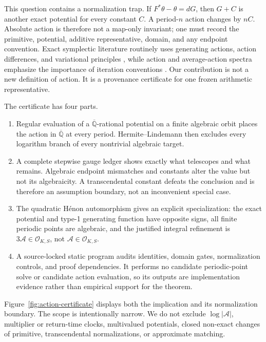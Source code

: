 \documentclass[11pt]{article}
\theoremstyle{definition}
\theoremstyle{remark}
\newcommand{\Qbar}{\overline{\mathbb Q}}
\newcommand{\Action}{\mathcal A}
\newcommand{\OKS}{\mathcal O_{K,S}}
\begin{document}
This question contains a normalization trap.  If
$F^*\theta-\theta=dG$, then $G+C$ is another exact potential for every
constant $C$.  A period-$n$ action changes by $nC$.  Absolute action is
therefore not a map-only invariant; one must record the primitive, potential,
additive representative, domain, and any endpoint convention.  Exact
symplectic literature routinely uses generating actions, action differences,
and variational principles \citep{kook1989periodic,mackay1984transport,
meiss1992symplectic,delshams1997melnikov}, while action and average-action
spectra emphasize the importance of iteration conventions
\citep{ginzburg2009action,mazzucchelli2013degenerate}.  Our contribution is
not a new definition of action.  It is a provenance certificate for one
frozen arithmetic representative.

The certificate has four parts.
\begin{enumerate}
  \item Regular evaluation of a $\Qbar$-rational potential on a finite
  algebraic orbit places the action in $\Qbar$ at every period.
  Hermite--Lindemann then excludes every logarithm branch of every
  nontrivial algebraic target.
  \item A complete stepwise gauge ledger shows exactly what telescopes and
  what remains.  Algebraic endpoint mismatches and constants alter the value
  but not its algebraicity.  A transcendental constant defeats the conclusion
  and is therefore an assumption boundary, not an inconvenient special case.
  \item The quadratic H\'enon automorphism gives an explicit specialization:
  the exact potential and type-1 generating function have opposite signs,
  all finite periodic points are algebraic, and the justified integral
  refinement is $3\Action\in\OKS$, not $\Action\in\OKS$.
  \item A source-locked static program audits identities, domain gates,
  normalization controls, and proof dependencies.  It performs no candidate
  periodic-point solve or candidate action evaluation, so its outputs are
  implementation evidence rather than empirical support for the theorem.
\end{enumerate}

Figure~\ref{fig:action-certificate} displays both the implication and its
normalization boundary.  The scope is intentionally narrow.  We do not
exclude $\log|\Action|$, multiplier or return-time clocks, multivalued
potentials, closed non-exact changes of primitive, transcendental
normalizations, or approximate matching.
\end{document}
